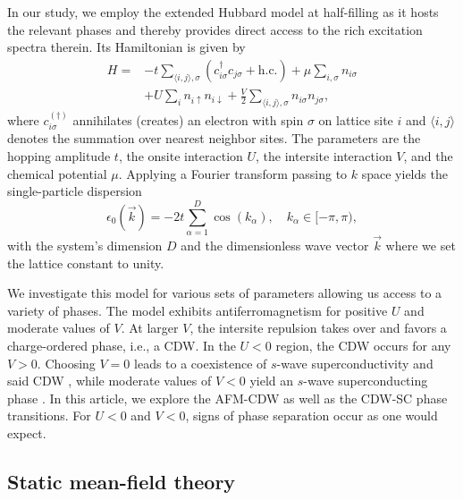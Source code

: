 \documentclass[
    reprint, 
    aps,
    preprintnumbers,
    twocolumn,
    prb,
    superscriptaddress
]{revtex4-2}
\newcommand{\vk}{\vec{k}}
\begin{document}
In our study, we employ the extended Hubbard model at half-filling as it hosts
the relevant phases and thereby provides direct access to the rich excitation spectra therein.
Its Hamiltonian is given by
\begin{align}
\nonumber
        H = &-t \sum_{\langle i, j \rangle, \sigma} \left( c_{i\sigma}^\dagger c_{j\sigma} + \text{h.c.} \right) 
        + \mu \sum_{i,\sigma} n_{i\sigma} \\
        & + U \sum_{i} n_{i\uparrow} n_{i\downarrow} 
        + \frac{V}{2} \sum_{\langle i, j\rangle, \sigma} n_{i\sigma} n_{j\sigma},
				    \label{eqn:full_hamiltonian}
\end{align}
where $c_{i\sigma}^{(\dagger)}$ annihilates (creates) an electron with spin $\sigma$ on lattice site $i$ 
and $\langle i, j\rangle$ denotes the summation over nearest neighbor sites.
The parameters are the hopping amplitude $t$, the onsite interaction $U$, the intersite interaction $V$, and the chemical potential $\mu$.
Applying a Fourier transform passing to $k$ space yields the single-particle dispersion 
\begin{equation}
    \epsilon_0 (\vk) = -2t \sum_{\alpha=1}^D \cos(k_\alpha), \quad k_\alpha \in [-\pi, \pi),
\end{equation}
with the system's dimension $D$ and the dimensionless wave vector $\vk$ where we set the lattice constant to unity.

We investigate this model for various sets of parameters allowing us access to a variety of phases.
The model exhibits antiferromagnetism for positive $U$ and moderate values of $V$.
At larger $V$, the intersite repulsion takes over and favors a charge-ordered phase, i.e., a CDW.
In the $U<0$ region, the CDW occurs for any $V>0$.
Choosing $V=0$ leads to a coexistence of $s$-wave superconductivity and said CDW \cite{yang90}, while moderate
values of  $V<0$ yield an $s$-wave superconducting phase \cite{Micnas88b}.
In this article, we explore the AFM-CDW as well as the CDW-SC phase transitions.
For $U<0$ and $V<0$, signs of phase separation occur as one would expect.


\subsection{Static mean-field theory}
\end{document}
